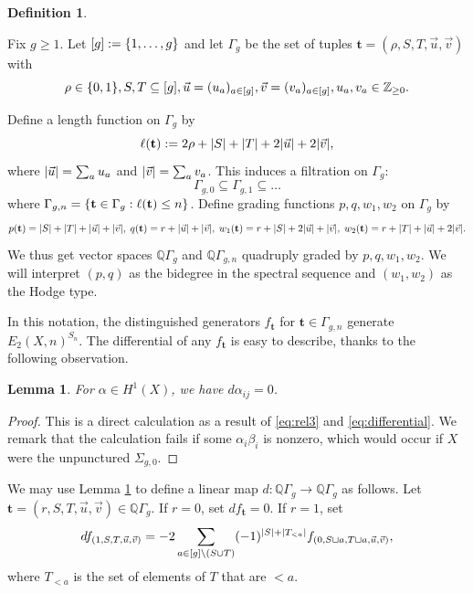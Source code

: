 \documentclass[11pt,reqno]{amsproc}
\numberwithin{equation}{section}
\newtheorem{lemma}[theorem]{Lemma}
\theoremstyle{definition}
\newtheorem{definition}[theorem]{Definition}
\theoremstyle{remark}
\newcommand\Z{{\mathbb Z}}
\newcommand\Q{{\mathbb Q}}
\newcommand\subeq{\subseteq}
\DeclarePairedDelimiter{\abs}{\lvert}{\rvert}
\DeclarePairedDelimiter{\set}{\{}{\}}
\begin{document}
\begin{definition} \label{def:type}
    
Fix $g\geq 1$. Let $[g]:=\set{1,\dots,g}$ and let $\Gamma_{g}$ be the set of tuples $\mathbf{t}=(\rho,S,T,\vec u,\vec v)$ with
\begin{equation}
    \rho\in \set{0,1}, S,T\subeq [g], \vec u=(u_a)_{a\in [g]}, \vec v=(v_a)_{a\in [g]}, u_a,v_a\in \Z_{\geq 0}.
\end{equation}

Define a length function on $\Gamma_g$ by
\begin{equation}
    \ell(\mathbf{t}):=2\rho+\abs{S}+\abs{T}+2\abs{\vec u}+2\abs{\vec v},
\end{equation}
where $\abs{\vec u}=\sum_a u_a$ and $\abs{\vec v}=\sum_a v_a$. This induces a filtration on $\Gamma_g$:
\begin{equation}
    \Gamma_{g,0}\subeq \Gamma_{g,1}\subeq \dots
\end{equation}
where $\Gamma_{g,n}=\set{\mathbf{t}\in \Gamma_g: \ell(\mathbf{t})\leq n}$. Define grading functions $p,q,w_1,w_2$ on $\Gamma_g$ by
\begin{equation}\label{eq:grading}
    p(\mathbf{t})=\abs{S}+\abs{T}+\abs{\vec u}+\abs{\vec v}, \; q(\mathbf{t})=r+\abs{\vec u}+\abs{\vec v}, \; w_1(\mathbf{t})=r+\abs{S}+2\abs{\vec u}+\abs{\vec v}, \; w_2(\mathbf{t})=r+\abs{T}+\abs{\vec u}+2\abs{\vec v}.
\end{equation}
We thus get vector spaces $\Q \Gamma_g$ and $\Q \Gamma_{g,n}$ quadruply graded by $p,q,w_1,w_2$. We will interpret $(p,q)$ as the bidegree in the spectral sequence and $(w_1,w_2)$ as the Hodge type.
\end{definition}

In this notation, the distinguished generators $f_\mathbf{t}$ for $\mathbf{t}\in \Gamma_{g,n}$ generate $E_2(X,n)^{S_n}$. The differential of any $f_\mathbf{t}$ is easy to describe, thanks to the following observation.

\begin{lemma}\label{lem:diff-vanish}
For $\alpha\in H^1(X)$, we have $d\alpha_{ij}=0$. 
\end{lemma}
\begin{proof}
This is a direct calculation as a result of \eqref{eq:rel3} and \eqref{eq:differential}. We remark that the calculation fails if some $\alpha_i\beta_i$ is nonzero, which would occur if $X$ were the unpunctured $\Sigma_{g,0}$. 
\end{proof}

We may use Lemma \ref{lem:diff-vanish} to define a linear map $d:\Q\Gamma_g\to \Q\Gamma_g$ as follows. Let $\mathbf{t}=(r,S,T,\vec u,\vec v)\in \Q\Gamma_g$. If $r=0$, set $df_\mathbf{t}=0$. If $r=1$, set
\begin{equation}\label{eq:diff-abstract}
    df_{(1,S,T,\vec u,\vec v)}=-2\sum_{a\in [g]\setminus (S\cup T)} (-1)^{\abs{S}+\abs{T_{<a}}}f_{(0,S\sqcup a,T\sqcup a, \vec u,\vec v)},
\end{equation}
where $T_{<a}$ is the set of elements of $T$ that are $<a$. 
\end{document}

